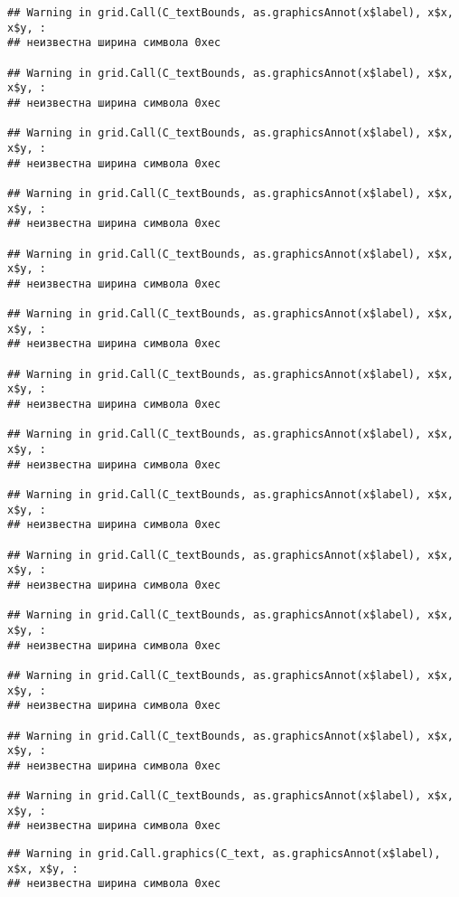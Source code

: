 \documentclass[
]{article}
\begin{document}
\begin{verbatim}
## Warning in grid.Call(C_textBounds, as.graphicsAnnot(x$label), x$x, x$y, :
## неизвестна ширина символа 0xec

## Warning in grid.Call(C_textBounds, as.graphicsAnnot(x$label), x$x, x$y, :
## неизвестна ширина символа 0xec

## Warning in grid.Call(C_textBounds, as.graphicsAnnot(x$label), x$x, x$y, :
## неизвестна ширина символа 0xec

## Warning in grid.Call(C_textBounds, as.graphicsAnnot(x$label), x$x, x$y, :
## неизвестна ширина символа 0xec

## Warning in grid.Call(C_textBounds, as.graphicsAnnot(x$label), x$x, x$y, :
## неизвестна ширина символа 0xec

## Warning in grid.Call(C_textBounds, as.graphicsAnnot(x$label), x$x, x$y, :
## неизвестна ширина символа 0xec

## Warning in grid.Call(C_textBounds, as.graphicsAnnot(x$label), x$x, x$y, :
## неизвестна ширина символа 0xec

## Warning in grid.Call(C_textBounds, as.graphicsAnnot(x$label), x$x, x$y, :
## неизвестна ширина символа 0xec

## Warning in grid.Call(C_textBounds, as.graphicsAnnot(x$label), x$x, x$y, :
## неизвестна ширина символа 0xec

## Warning in grid.Call(C_textBounds, as.graphicsAnnot(x$label), x$x, x$y, :
## неизвестна ширина символа 0xec

## Warning in grid.Call(C_textBounds, as.graphicsAnnot(x$label), x$x, x$y, :
## неизвестна ширина символа 0xec

## Warning in grid.Call(C_textBounds, as.graphicsAnnot(x$label), x$x, x$y, :
## неизвестна ширина символа 0xec

## Warning in grid.Call(C_textBounds, as.graphicsAnnot(x$label), x$x, x$y, :
## неизвестна ширина символа 0xec

## Warning in grid.Call(C_textBounds, as.graphicsAnnot(x$label), x$x, x$y, :
## неизвестна ширина символа 0xec
\end{verbatim}

\begin{verbatim}
## Warning in grid.Call.graphics(C_text, as.graphicsAnnot(x$label), x$x, x$y, :
## неизвестна ширина символа 0xec
\end{verbatim}
\end{document}
